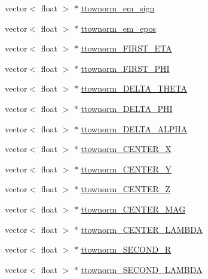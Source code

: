 \begin{DoxyCompactItemize}
\item 
vector$<$ float $>$ $\ast$ \hyperlink{classCollectionTree_a23dd56d9bf86f1b6b62eccafb96c44c1}{ttownorm\+\_\+em\+\_\+sign}
\item 
vector$<$ float $>$ $\ast$ \hyperlink{classCollectionTree_aaa8c4683ff15599b7e78e1c52d91d705}{ttownorm\+\_\+em\+\_\+epos}
\item 
vector$<$ float $>$ $\ast$ \hyperlink{classCollectionTree_a90b6ef460e4a1d20eaa7e7f64c691637}{ttownorm\+\_\+\+F\+I\+R\+S\+T\+\_\+\+E\+TA}
\item 
vector$<$ float $>$ $\ast$ \hyperlink{classCollectionTree_ab60bf59507142b207a6c43219197e6d8}{ttownorm\+\_\+\+F\+I\+R\+S\+T\+\_\+\+P\+HI}
\item 
vector$<$ float $>$ $\ast$ \hyperlink{classCollectionTree_a192501b9a6cbdc9b514b1b10c68d55d6}{ttownorm\+\_\+\+D\+E\+L\+T\+A\+\_\+\+T\+H\+E\+TA}
\item 
vector$<$ float $>$ $\ast$ \hyperlink{classCollectionTree_ad20b63204870ed86adf1ff782ce24c39}{ttownorm\+\_\+\+D\+E\+L\+T\+A\+\_\+\+P\+HI}
\item 
vector$<$ float $>$ $\ast$ \hyperlink{classCollectionTree_a98b938f2cdaa4197a8c06ca9df83d2fa}{ttownorm\+\_\+\+D\+E\+L\+T\+A\+\_\+\+A\+L\+P\+HA}
\item 
vector$<$ float $>$ $\ast$ \hyperlink{classCollectionTree_a828f6cb7bbd8adbd36170b75d9032599}{ttownorm\+\_\+\+C\+E\+N\+T\+E\+R\+\_\+X}
\item 
vector$<$ float $>$ $\ast$ \hyperlink{classCollectionTree_a4a0cd62a3f8bc6d1e666bedb977ac4ae}{ttownorm\+\_\+\+C\+E\+N\+T\+E\+R\+\_\+Y}
\item 
vector$<$ float $>$ $\ast$ \hyperlink{classCollectionTree_a6ad90e73de64f8f1b5e5583950f87a4f}{ttownorm\+\_\+\+C\+E\+N\+T\+E\+R\+\_\+Z}
\item 
vector$<$ float $>$ $\ast$ \hyperlink{classCollectionTree_a4389b354ed96ba9cb13bf3df1c929d81}{ttownorm\+\_\+\+C\+E\+N\+T\+E\+R\+\_\+\+M\+AG}
\item 
vector$<$ float $>$ $\ast$ \hyperlink{classCollectionTree_a0e2bbcadf82a3c8e5f84133d45bb5c3d}{ttownorm\+\_\+\+C\+E\+N\+T\+E\+R\+\_\+\+L\+A\+M\+B\+DA}
\item 
vector$<$ float $>$ $\ast$ \hyperlink{classCollectionTree_a7944e9cd9b4c459ef85d907438a92ed4}{ttownorm\+\_\+\+S\+E\+C\+O\+N\+D\+\_\+R}
\item 
vector$<$ float $>$ $\ast$ \hyperlink{classCollectionTree_a69228da169909f6ff28d67b3b6c2ef8b}{ttownorm\+\_\+\+S\+E\+C\+O\+N\+D\+\_\+\+L\+A\+M\+B\+DA}
\item 

\end{DoxyCompactItemize}
